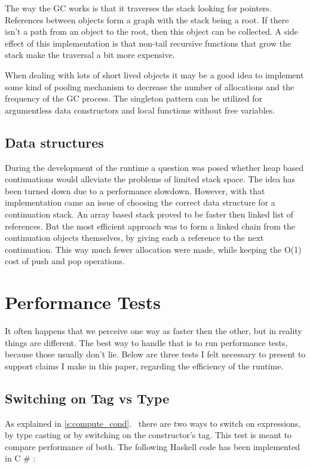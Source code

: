 \documentclass[en]{pracamgr}
\newcommand{\shrp}{%
  {\fontfamily{ppl}\selectfont\#%
  }}
\newcommand{\myref}[1]{\ref{#1}.~\textit{\nameref{#1}}}
\begin{document}
The way the GC works is that it traverses the stack looking
for pointers. References between objects form a graph with
the stack being a root. If there isn't a path from an object
to the root, then this object can be collected.
A side effect of this implementation is that
non-tail recursive functions that grow the stack
make the traversal a bit more expensive.

When dealing with lots of short lived objects it may be
a good idea to implement some kind of pooling mechanism
to decrease the number of allocations and the frequency of
the GC process. The singleton pattern can be utilized
for argumentless data constructors and local functions
without free variables.

\subsection{Data structures}

During the development of the runtime a question was posed
whether heap based continuations would alleviate the problems
of limited stack space. The idea has been turned down
due to a performance slowdown.
However, with that implementation came an issue
of choosing the correct data structure for a continuation stack.
An array based stack proved to be faster then linked list of references.
But the most efficient approach was to form a linked chain
from the continuation objects themselves, by giving each a reference
to the next continuation.
This way much fewer allocation were made, while keeping
the O(1) cost of push and pop operations.

\section{Performance Tests}
It often happens that we perceive one way as faster then the other,
but in reality things are different. The best way to handle that
is to run performance tests, because those usually don't lie.
Below are three tests I felt necessary to present to support
claims I make in this paper, regarding the efficiency of the runtime.

\subsection{Switching on Tag vs Type}\label{perf:switching}

As explained in \myref{s:compute_cond} there are two ways
to switch on expressions, by type casting or by switching
on the constructor's tag. This test is meant to compare
performance of both. The following Haskell code has been implemented in C\shrp{}:
\end{document}
